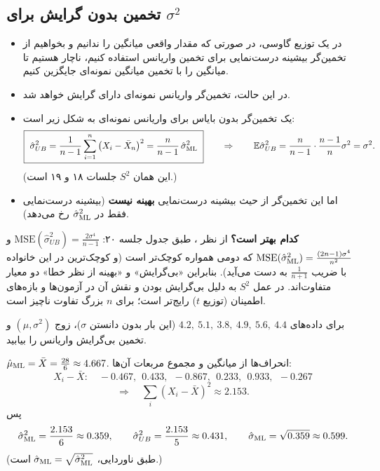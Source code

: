 \subsection{تخمین بدون گرایش  برای $\sigma^2$}
\begin{itemize}
\item در یک توزیع گاوسی، در صورتی که مقدار واقعی میانگین را ندانیم و بخواهیم از تخمین‌گر بیشینه درست‌نمایی برای تخمین واریانس استفاده کنیم، ناچار هستیم تا میانگین را با تخمین میانگین نمونه‌ای  جایگزین کنیم.
\item در این حالت، تخمین‌گر واریانس نمونه‌ای  دارای گرایش  خواهد شد.
\item یک تخمین‌گر بدون بایاس برای واریانس نمونه‌ای به شکل زیر است:
\[
\boxed{\ \hat\sigma^2_{UB}=\frac{1}{n-1}\sum_{i=1}^n\big(X_i-\bar X_n\big)^2=\frac{n}{n-1}\,\hat\sigma^2_\ML\ }
\qquad\Rightarrow\qquad\E\hat\sigma^2_{UB}=\frac{n}{n-1}\cdot\frac{n-1}{n}\sigma^2=\sigma^2 .
\]
(این همان $S^2$ جلسات ۱۸ و ۱۹ است.)
\item اما این تخمین‌گر از حیث بیشینه درست‌نمایی \textbf{بهینه نیست} (بیشینه درست‌نمایی فقط در $\hat\sigma^2_{\mathrm{ML}}$ رخ می‌دهد).
\end{itemize}

\begin{note}
\notetitle \textbf{کدام بهتر است؟} از نظر ، طبق جدول جلسه ۲۰: $\mathrm{MSE}(\hat\sigma^2_{UB})=\frac{2\sigma^4}{n-1}$ و $\mathrm{MSE}(\hat\sigma^2_{\mathrm{ML}})=\frac{(2n-1)\sigma^4}{n^2}$ که دومی همواره کوچک‌تر است (و کوچک‌ترین  در این خانواده با ضریب $\frac{1}{n+1}$ به دست می‌آید). بنابراین «بی‌گرایش» و «بهینه از نظر خطا» دو معیار متفاوت‌اند. در عمل $S^2$ به دلیل بی‌گرایش بودن و نقش آن در آزمون‌ها و بازه‌های اطمینان (توزیع $t$) رایج‌تر است؛ برای $n$ بزرگ تفاوت ناچیز است.
\end{note}

\begin{example}
برای داده‌های $4.2,\ 5.1,\ 3.8,\ 4.9,\ 5.6,\ 4.4$ (این بار بدون دانستن $\sigma$)،  زوج $(\mu,\sigma^2)$ و تخمین بی‌گرایش واریانس را بیابید.
\begin{solution}
$\hat\mu_{\mathrm{ML}}=\bar X=\frac{28}{6}\approx4.667$. انحراف‌ها از میانگین و مجموع مربعات آن‌ها:
\[
X_i-\bar X:\quad -0.467,\ \ 0.433,\ \ -0.867,\ \ 0.233,\ \ 0.933,\ \ -0.267
\]
\[
\Rightarrow\quad\sum_i(X_i-\bar X)^2\approx2.153 .
\]
پس
\[
\hat\sigma^2_{\mathrm{ML}}=\frac{2.153}{6}\approx0.359,\qquad\hat\sigma^2_{UB}=\frac{2.153}{5}\approx0.431,\qquad\hat\sigma_{\mathrm{ML}}=\sqrt{0.359}\approx0.599 .
\]
(طبق ناوردایی، $\hat\sigma_{\mathrm{ML}}=\sqrt{\hat\sigma^2_{\mathrm{ML}}}$ است.)
\end{solution}
\end{example}

